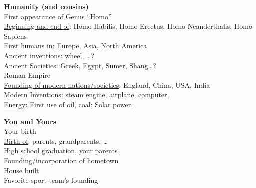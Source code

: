 \documentclass[12pt]{article}
\begin{document}
\begin{multicols}{2}
\begin{tcolorbox}[colback=white,colframe=black,boxrule=0.5pt,arc=2mm,
  left=4pt,right=4pt,top=6pt,bottom=6pt,height=11cm,valign=center]
\vspace{4cm}



\end{tcolorbox}
\vspace{6pt}

\begin{tcolorbox}[colback=white,colframe=black,boxrule=0.5pt,arc=2mm,
  left=4pt,right=4pt,top=6pt,bottom=6pt,height=11cm,valign=center]
\textbf{Humanity (and cousins)}\\[4pt]
First appearance of Genus ``Homo''\\
\underline{Beginning and end of}: Homo Habilis, Homo Erectus, Homo Neanderthalis, Homo Sapiens\\
\underline{First humans in}: Europe, Asia, North America\\
\underline{Ancient inventions}: wheel, \ldots?\\
\underline{Ancient Societies}: Greek, Egypt, Sumer, Shang\ldots?\\
Roman Empire\\
\underline{Founding of modern nations/societies}: England, China, USA, India\\
\underline{Modern Inventions}: steam engine, airplane, computer, \\
\underline{Energy}: First use of oil, coal; Solar power, \\


\vspace{3cm}


\end{tcolorbox}
\vspace{6pt}
\begin{tcolorbox}[colback=white,colframe=black,boxrule=0.5pt,arc=2mm,
  left=4pt,right=4pt,top=6pt,bottom=6pt,height=11cm,valign=center]
\textbf{You and Yours}\\[4pt]
Your birth\\
\underline{Birth of}: parents, grandparents, \ldots\\
High school graduation, your parents\\
Founding/incorporation of hometown\\
House built\\
Favorite sport team's founding\\



\vspace{6cm}



\end{tcolorbox}


\end{multicols}
\end{document}
